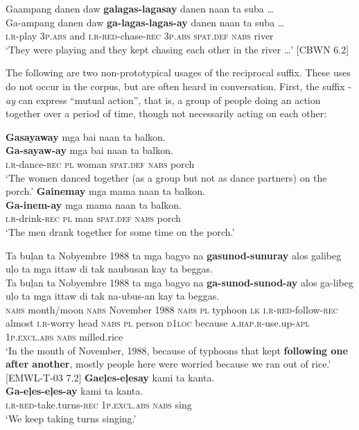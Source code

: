 \ea
Gaampang  danen  daw  \textbf{galagas-lagasay} danen  naan  ta  suba … \\\smallskip
\gll Ga-ampang  danen  daw  \textbf{ga-lagas-lagas-ay} danen  naan  ta  {suba …} \\
\textsc{i.r}-play  3\textsc{p.abs}  and  \textsc{i.r-red}-chase-\textsc{rec}  3\textsc{p.abs}  \textsc{spat.def}  \textsc{nabs}  river \\
\glt ‘They were  playing and they kept chasing each other in the river …’ [CBWN 6.2]
\z

The following are two non-prototypical usages of the reciprocal suffix. These uses do not occur in the corpus, but are often heard in conversation. First, the suffix -\textit{ay} can express “mutual action”, that is, a group of people doing an action together over a period of time, though not necessarily acting on each other:

\ea
\textbf{Gasayaway}  mga  bai  naan  ta  balkon. \\\smallskip
\gll \textbf{Ga-sayaw-ay}  mga  bai  naan  ta  balkon. \\
\textsc{i.r}-dance-\textsc{rec}  \textsc{pl} woman  \textsc{spat.def}  \textsc{nabs}  porch \\
\glt ‘The women danced together (as a group but not as dance partners) on the porch.’
\z
\ea
\textbf{Gainemay}  mga  mama  naan  ta  balkon. \\\smallskip
\gll \textbf{Ga-inem-ay}  mga  mama  naan  ta  balkon. \\
\textsc{  i.r}-drink-\textsc{rec}  \textsc{pl}  man  \textsc{spat.def}  \textsc{nabs}  porch \\
\glt ‘The men drank together for some time on the porch.’
\z

\ea
Ta  buļan  ta  Nobyembre  1988  ta  mga  bagyo  na  \textbf{gasunod-sunuray}  alos  galibeg  uļo  ta  mga  ittaw  di tak  naubusan  kay  ta  beggas.\\\smallskip
\gll Ta  buļan  ta  Nobyembre  1988  ta  mga  bagyo  na  \textbf{ga-sunod-sunod-ay}  alos  ga-libeg  uļo  ta  mga  ittaw  di tak  na-ubus-an  kay  ta  beggas.\\
\textsc{nabs}  month/moon  \textsc{nabs}  November  1988  \textsc{nabs}  \textsc{pl}  typhoon  \textsc{lk} \textsc{i.r}-\textsc{red}-follow-\textsc{rec}  almost  \textsc{i.r}-worry  head  \textsc{nabs}  \textsc{pl}  person \textsc{d}1\textsc{loc}  because  \textsc{a.hap.r}-use.up-\textsc{apl}  1\textsc{p.excl.abs}  \textsc{nabs}  milled.rice \\
\glt `In the month of November, 1988, because of typhoons that kept \textbf{following one after another}, mostly people here were worried because we ran out of rice.’ [EMWL-T-03 7.2]
\z
\ea
\textbf{Gaeļes-eļesay}  kami  ta  kanta. \\\smallskip
\gll \textbf{Ga-eļes-eļes-ay}  kami  ta  kanta. \\
\textsc{i.r}-\textsc{red}-take.turns-\textsc{rec}  1\textsc{p.excl.abs}  \textsc{nabs} sing \\
\glt ‘We keep taking turns singing.’
\z

